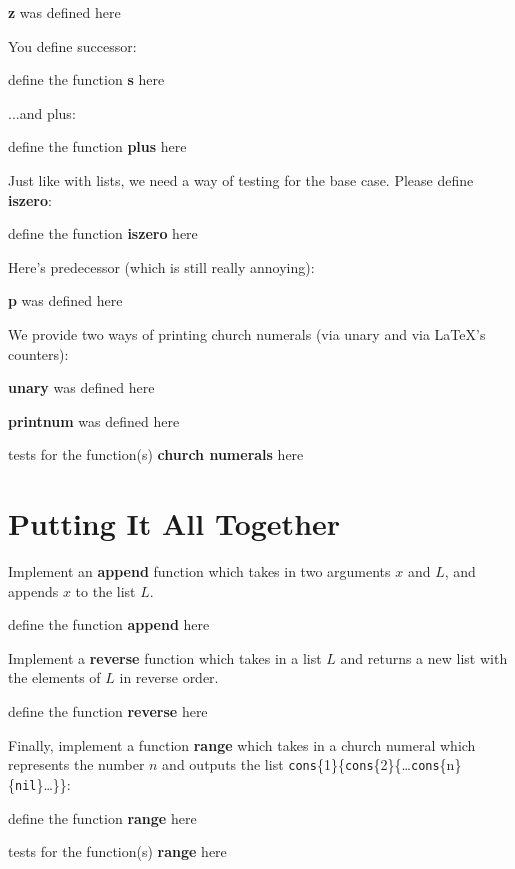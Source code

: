 \documentclass{article}
\newcommand{\op}[1]{\textbf{#1}}
\newcommand{\begintodo}[1]{\begin{center}define the function \op{#1} here\end{center}}
\newcommand{\begindone}[1]{\begin{center}\op{#1} was defined here\end{center}}
\newcommand{\finishtodo}[1]{}
\newcommand{\finishdone}[1]{}
\newcommand{\test}[2]{#1 = #2\par}
\newcommand{\begintests}[1]{\begin{center}tests for the function(s) \op{#1} here\\}
\newcommand{\finishtests}[1]{\end{center}}
\renewcommand{\c}[2]{\texttt{cons}\{#1\}\{#2\}}
\begin{document}
\begindone{z}
\newcommand{\z}[1]{\id}
\finishdone{z}

You define successor:

\begintodo{s}
\newcommand{\s}[3]{}
\finishtodo{s}

...and plus:

\begintodo{plus}
\newcommand{\plus}[4]{#1{#3}{#2{#3}{#4}}}
\finishtodo{s}

Just like with lists, we need a way of testing for the base case.  Please define
\op{iszero}:

\begintodo{iszero}
\newcommand{\iszero}[1]{}
\finishtodo{iszero}

Here's predecessor (which is still really annoying):

\begindone{p}
\newcommand{\phelpa}[3]{#3{#2{#1}}}
\newcommand{\phelpb}[2]{#1}
\newcommand{\p}[3]{#1{\phelpa{#2}}{\phelpb{#3}}{\id}}
\finishdone{p}

We provide two ways of printing church numerals (via unary and via \LaTeX's
counters):

\begindone{unary}
\newcommand{\recUnary}[2]{\ifthenelse{\iszero{#2}}{}{1{#1 {\p{#2}}}}}
\newcommand{\unary}[1]{\Y{\recUnary}{#1}}
\finishdone{unary}

\begindone{printnum}
\newcommand{\recPrintNum}[2]{\ifthenelse{\iszero{#2}}{}{\addtocounter{num}{1}{#1{\p{#2}}}}}
\newcommand{\printnum}[1]{\setcounter{num}{0}{\Y{\recPrintNum}{#1}}\arabic{num}}
\finishdone{printnum}

\begintests{church numerals}
\finishtests{church numerals}

\section{Putting It All Together}
Implement an \op{append} function which takes in two arguments $x$ and $L$, and appends $x$ to the list $L$.

\begintodo{append}
\newcommand{\append}[2]{}
\finishtodo{append}

Implement a \op{reverse} function which takes in a list $L$ and returns a new list with the elements of $L$ 
in reverse order.

\begintodo{reverse}
\newcommand{\reverse}[1]{}
\finishtodo{reverse}

Finally, implement a function \op{range} which takes in a church numeral which represents the number $n$ and
outputs the list \c{1}{\c{2}{\dots\c{n}{\texttt{nil}}\dots}}:

\begintodo{range}
\newcommand{\range}[1]{}
\finishtodo{range}

\begintests{range}
\finishtests{range}
\end{document}
